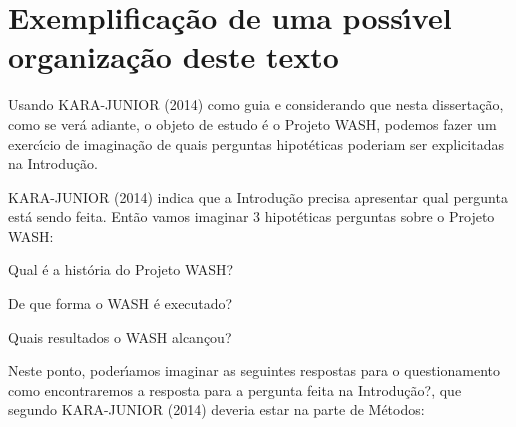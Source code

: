 \documentclass[
12pt,		%
openright,	%
twoside,  %
a4paper,			%
chapter=TITLE,		%
english,			%
french,				%
spanish,			%
brazil				%
]{USPSC-classe/USPSC}
\begin{document}
\section[Exemplifica\c{c}\~ao de uma poss\'{\i}vel organiza\c{c}\~ao deste texto]{Exemplifica\c{c}\~ao de uma poss\'{\i}vel organiza\c{c}\~ao deste texto}\label{Exemplifica\c{c}\~ao de uma poss\'{\i}vel organiza\c{c}\~ao deste texto}
Usando  KARA-JUNIOR (2014) como guia e considerando que nesta disserta\c{c}\~ao, como se ver\'a adiante, o objeto de estudo \'e o Projeto WASH, podemos fazer um exerc\'{\i}cio de imagina\c{c}\~ao de quais perguntas hipot\'eticas poderiam ser explicitadas na Introdu\c{c}\~ao.














 KARA-JUNIOR (2014) indica que a Introdu\c{c}\~ao precisa apresentar qual pergunta est\'a sendo feita. Ent\~ao vamos imaginar 3 hipot\'eticas perguntas sobre o Projeto WASH:















\begin{alineas}
\item \textquotedbl Qual \'e a hist\'oria do Projeto WASH?\textquotedbl 
\item \textquotedbl De que forma o WASH \'e executado?\textquotedbl 
\item \textquotedbl Quais resultados o WASH alcan\c{c}ou?\textquotedbl 
\end{alineas}

Neste ponto, poder\'{\i}amos imaginar as seguintes respostas para o questionamento \textquotedbl como encontraremos a resposta para a pergunta feita na Introdu\c{c}\~ao?\textquotedbl , que segundo KARA-JUNIOR (2014) deveria estar na parte de M\'etodos:
\end{document}
